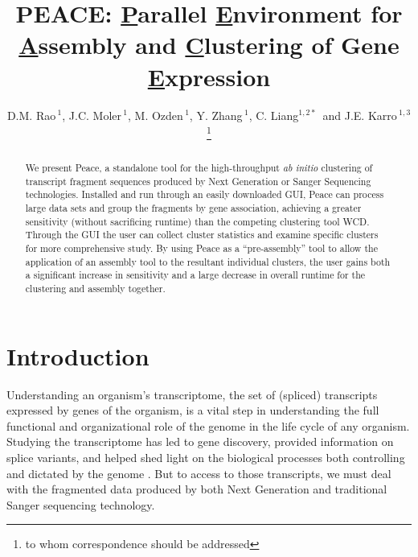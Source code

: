 \documentclass[a4,center,fleqn]{NAR}
\begin{document}
\title{PEACE: {\underline P}arallel {\underline E}nvironment for {\underline A}ssembly
  and {\underline C}lustering of Gene {\underline E}xpression}

\author{D.M. Rao\,$^{1}$, J.C. Moler\,$^{1}$, M. Ozden\,$^1$, Y. Zhang\,$^{1}$,
  C. Liang$^{1,2*}$\, and J.E. Karro\,$^{1,3}$\footnote{to whom
    correspondence should be addressed}}

\address{$^1$ Department of Computer Science and Software Engineering, \\
  $^2$ Department of Botany, \\
  $^3$ and Department of Microbiology, Miami University, Oxford, Ohio,
  USA}




\maketitle

\begin{abstract}
  We present {\sc Peace}, a standalone tool for the high-throughput
  {\it ab initio} clustering of transcript fragment sequences produced by Next
  Generation or Sanger Sequencing technologies.  Installed and run
  through an easily downloaded GUI, {\sc Peace} can process large data
  sets and group the fragments by gene association, achieving a
  greater sensitivity (without sacrificing runtime) than the competing
  clustering tool {\sc WCD}.  Through the GUI the user can collect
  cluster statistics and examine specific clusters for more
  comprehensive study.  By using {\sc Peace} as a ``pre-assembly''
  tool to allow the application of an assembly tool to the resultant
  individual clusters, the user gains both a significant increase in
  sensitivity and a large decrease in overall runtime for the
  clustering and assembly together.
\end{abstract}


\section{Introduction}

Understanding an organism's transcriptome, the set of (spliced)
transcripts expressed by genes of the organism, is a vital step in
understanding the full functional and organizational role of the
genome in the life cycle of any organism.  Studying the transcriptome
has led to gene discovery, provided information on splice variants,
and helped shed light on the biological processes both controlling and
dictated by the genome \cite{Nagaraj07}.  But to access to those
transcripts, we must deal with the fragmented data produced by
both Next Generation and traditional Sanger sequencing technology.
\end{document}
